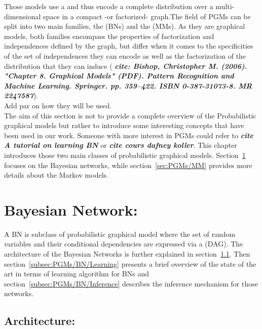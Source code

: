 \documentclass[a4paper,11pt]{report}
\begin{document}
{  Those models use a  and thus encode a complete distribution over a multi-dimensional space in a compact -or factorized- graph.The field of PGMs can be split into two main families, the  (BNs) and the  (MMs). As they are graphical models, both families encompass the properties of factorization and independences defined by the graph, but differ when it comes to the specificities of the set of independences they can encode as well as the factorization of the distribution that they can induce (  \textbf{\textit{cite: Bishop, Christopher M. (2006). "Chapter 8. Graphical Models" (PDF). Pattern Recognition and Machine Learning. Springer. pp. 359–422. ISBN 0-387-31073-8. MR 2247587}}).\\
  
  Add par on how they will be used.\\ %
  
  The aim of this section is not to provide a complete overview of the Probabilistic graphical models but rather to introduce some interesting concepts that have been used in our work. Someone with more interest in PGMs could refer to \textbf{\textit{cite A tutorial on learning BN}} or \textbf{\textit{cite cours dafney koller}}. 
  This chapter introduces those two main classes of probabilistic graphical models. Section~\ref{sec:PGMs/BN} focuses on the Bayesian networks, while section~\ref{sec:PGMs/MM} provides more details about the Markov models.
	
  \section{Bayesian Network:}  
    \label{sec:PGMs/BN}
    A BN is subclass of probabilistic graphical model where the set of random variables and their conditional dependencies are expressed via a  (DAG). The architecture of the Bayesian Networks is further explained in section~\ref{subsec:PGMs/BN/Architecture}. Then section~\ref{subsec:PGMs/BN/Learning} presents a brief overview of the state of the art in terms of learning algorithm for BNs and section~\ref{subsec:PGMs/BN/Inference} describes the inference mechanism for those networks.
        
    \subsection{Architecture:}
      \label{subsec:PGMs/BN/Architecture}
      
}
\end{document}
